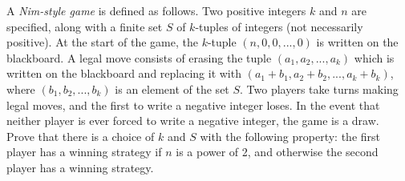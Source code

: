 A \emph{Nim-style game} is defined as follows. Two positive integers $k$ and $n$ are specified, along with a finite set $S$ of $k$-tuples of integers (not necessarily positive). At the start of the game, the $k$-tuple $(n, 0, 0, ..., 0)$ is written on the blackboard.
A legal move consists of erasing the tuple $(a_1,a_2,...,a_k)$ which is written on the blackboard and replacing it with $(a_1+b_1, a_2+b_2, ..., a_k+b_k)$, where $(b_1, b_2, ..., b_k)$ is an element of the set $S$. Two players take turns making legal moves, and the first to write a negative integer loses. In the event that neither player is ever forced to write a negative integer, the game is a draw.
Prove that there is a choice of $k$ and $S$ with the following property: the first player has a winning strategy if $n$ is a power of 2, and otherwise the second player has a winning strategy.